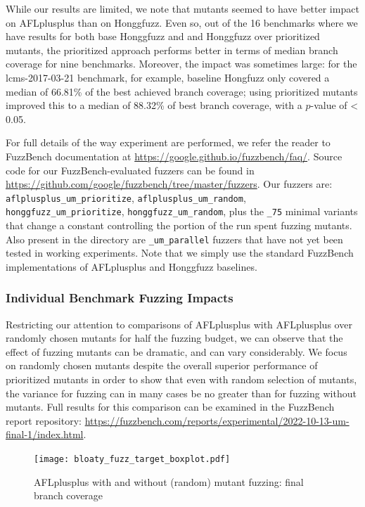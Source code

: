 While our results are limited, we note that mutants seemed to have better impact on AFLplusplus than on Honggfuzz.  Even so, out of  the 16 benchmarks where we have results for both base Honggfuzz and and Honggfuzz over prioritized mutants, the prioritized approach performs better in terms of median branch coverage for nine benchmarks.  Moreover, the impact was sometimes large:  for the lcms-2017-03-21 benchmark, for example, baseline Hongfuzz only covered a median of 66.81\% of the best achieved branch coverage; using prioritized mutants improved this to a median of 88.32\% of best branch coverage, with a $p$-value of < 0.05.

For full details of the way experiment are performed, we refer the reader to FuzzBench documentation at \url{https://google.github.io/fuzzbench/faq/}.  Source code for our FuzzBench-evaluated fuzzers can be found in \url{https://github.com/google/fuzzbench/tree/master/fuzzers}.  Our fuzzers are: {\tt aflplusplus\_um\_prioritize}, {\tt aflplusplus\_um\_random}, {\tt honggfuzz\_um\_prioritize}, {\tt honggfuzz\_um\_random}, plus the {\tt \_75} minimal variants that change a constant controlling the portion of the run spent fuzzing mutants.  Also present in the directory are {\tt \_um\_parallel} fuzzers that have not yet been tested in working experiments.  Note that we simply use the standard FuzzBench implementations of AFLplusplus and Honggfuzz baselines.

\subsubsection{Individual Benchmark Fuzzing Impacts}
    
Restricting our attention to comparisons of AFLplusplus with AFLplusplus over randomly chosen mutants for half the fuzzing budget, we can observe that the effect of fuzzing mutants can be dramatic, and can vary considerably.  We focus on randomly chosen mutants despite the overall superior performance of prioritized mutants in order to show that even with random selection of mutants, the variance for fuzzing can in many cases be no greater than for fuzzing without mutants.  Full results for this comparison can be examined in the FuzzBench report repository: \url{https://fuzzbench.com/reports/experimental/2022-10-13-um-final-1/index.html}.

\begin{figure}
  \texttt{[image: bloaty\_fuzz\_target\_boxplot.pdf]}
  \caption{AFLplusplus with and without (random) mutant fuzzing: final branch coverage}
  \label{fig:bloatybox}
  
\end{figure}


